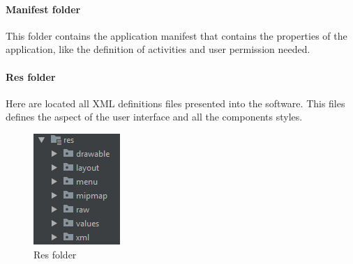 \paragraph{Manifest folder}
This folder contains the application manifest that contains the properties of the application, like the definition of activities and user permission needed. 

\paragraph{Res folder}
Here are located all XML definitions files presented into the software. 
This files defines the aspect of the user interface and all the components styles.

\begin{figure}[H]
\includegraphics[width=\linewidth]{images/Res.png}
\caption{ Res folder }
\label{fig:pkgsharedata}
\end{figure}


